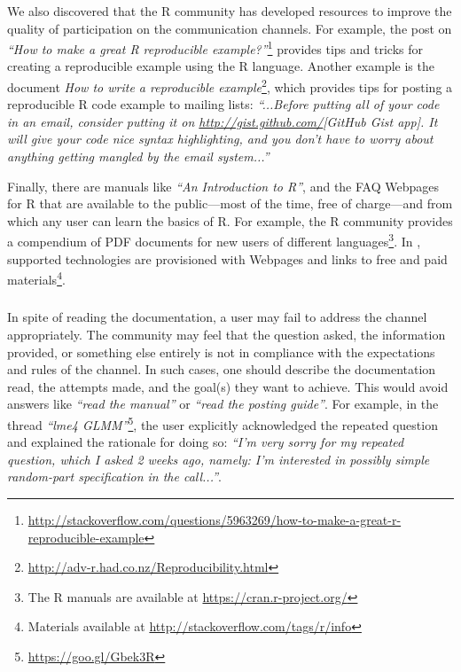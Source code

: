 We also discovered that the R community has developed resources to improve the quality of participation on the communication channels.
    For example, the post on \SO \textit{``How to make a great R reproducible example?''}\footnote{\href{http://stackoverflow.com/questions/5963269/how-to-make-a-great-r-reproducible-example}{http://stackoverflow.com/questions/5963269/how-to-make-a-great-r-reproducible-example}} provides tips and tricks for creating a reproducible example using the R language.
    Another example is the document \emph{How to write a reproducible
      example}\footnote{\url{http://adv-r.had.co.nz/Reproducibility.html}}, which provides tips for posting a reproducible R code example to mailing lists: \textit{``...Before putting all of your code in an email, consider putting it on \url{http://gist.github.com/}{[GitHub Gist app]}. It will give your code nice syntax highlighting, and you don't have to worry about anything getting mangled by the email system...''}

    Finally, there are manuals like \textit{``An Introduction to R''}, and the FAQ Webpages for R that are available to the public---most of the time, free of charge---and from which any user can learn the basics of R.
    For example, the R community provides a compendium of PDF documents for new users of different languages\footnote{The R manuals are available at \url{https://cran.r-project.org/}}.
    In \SO, supported technologies are provisioned with Webpages and links to free and paid materials\footnote{Materials available at \url{http://stackoverflow.com/tags/r/info}}.



\subsubsection{\recc}

    In spite of reading the documentation, a user may fail to address the channel appropriately.
    The community may feel that the question asked, the information provided, or something else entirely is not in compliance with the expectations and rules of the channel.
    In such cases, one should describe the documentation read, the attempts made, and the goal(s) they want to achieve.
    This would avoid answers like \textit{``read the manual''} or \textit{``read the posting guide''}. %
    For example, in the thread \textit{``lme4 GLMM''}\footnote{\url{https://goo.gl/Gbek3R}}, the user explicitly acknowledged the repeated question and explained the rationale for doing so: \textit{``I'm very sorry for my repeated question, which I asked 2 weeks ago, namely: I'm interested in possibly simple random-part specification in the call...''}.


